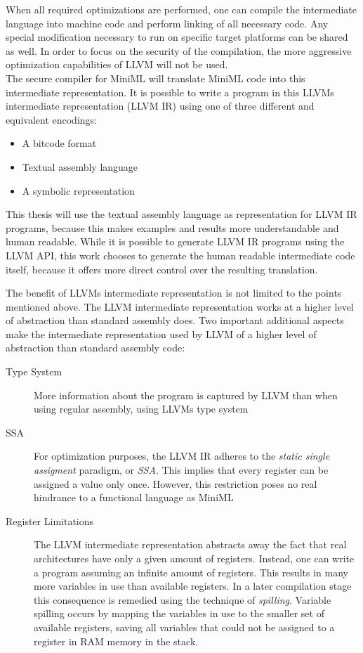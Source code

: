 \documentclass[10pt,a4paper,master=cws, masteroption=ai,english,inputenc=utf8]{kulemt}
\begin{document}
When all required optimizations are performed, one can compile the intermediate language into machine code and perform linking of all necessary code.
Any special modification necessary to run on specific target platforms can be shared as well.
In order to focus on the security of the compilation, the more aggressive optimization capabilities of LLVM will not be used.
\\[1em]
The secure compiler for \mbox{MiniML} will translate \mbox{MiniML} code into this intermediate representation.
It is possible to write a program in this LLVMs intermediate representation (LLVM IR) using one of three different and equivalent encodings:
\begin{itemize}
\item A bitcode format
\item Textual assembly language
\item A symbolic representation
\end{itemize}

This thesis will use the textual assembly language as representation for LLVM IR programs, because this makes examples and results more understandable and human readable.
While it is possible to generate LLVM IR programs using the LLVM API, this work chooses to generate the human readable intermediate code itself, because it offers more direct control over the resulting translation.

The benefit of LLVMs intermediate representation is not limited to the points mentioned above.
The LLVM intermediate representation works at a higher level of abstraction than standard assembly does.
Two important additional aspects make the intermediate representation used by LLVM of a higher level of abstraction than standard assembly code:

\begin{description}
\item[Type System] More information about the program is captured by LLVM than when using regular assembly, using LLVMs type system
\item[SSA] For optimization purposes, the LLVM IR adheres to the \emph{static single assigment} paradigm, or \emph{SSA}.
This implies that every register can be assigned a value only once. However, this restriction poses no real hindrance to a functional language as \mbox{MiniML}
\item[Register Limitations]  The LLVM intermediate representation abstracts away the fact that real architectures have only a given amount of registers.
Instead, one can write a program assuming an infinite amount of registers.
This results in many more variables in use than available registers.
In a later compilation stage this consequence is remedied using the technique of \emph{spilling}.
Variable spilling occurs by mapping the variables in use to the smaller set of available registers, saving all variables that could not be assigned to a register in RAM memory in the stack.
\end{description}
\end{document}
